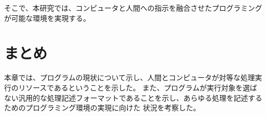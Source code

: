 そこで、本研究では、コンピュータと人間への指示を融合させたプログラミングが可能な環境を実現する。

\section{まとめ}\label{ux307eux3068ux3081}

本章では、プログラムの現状について示し、人間とコンピュータが対等な処理実行のリソースであるということを示した。
また、プログラムが実行対象を選ばない汎用的な処理記述フォーマットであることを示し、あらゆる処理を記述するためのプログラミング環境の実現に向けた
状況を考察した。
